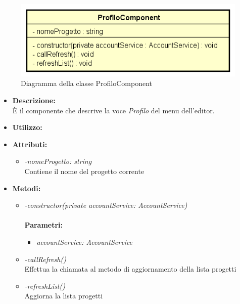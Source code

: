 \begin{figure}[h!]
	\centering
	\includegraphics[scale=0.8]{res/sections/SpecificaFrontEnd/Components/Disegnetti/profilo.png}
	\caption{Diagramma della classe ProfiloComponent}
\end{figure}

\begin{itemize}
	\item \textbf{Descrizione:}\\
	È il componente che descrive la voce \textit{Profilo} del menu dell'editor.
	\item \textbf{Utilizzo:}\\
	
	\item \textbf{Attributi:}
		\begin{itemize}
			\item \emph{-nomeProgetto: string}\\
			Contiene il nome del progetto corrente
		\end{itemize}
	\item \textbf{Metodi:}
		\begin{itemize}
			\item \emph{-constructor(private accountService: AccountService)}\\
    		\\
    		\textbf{Parametri:}
    		\begin{itemize}
    		    			
    			\item \emph{accountService: AccountService}\\
    			
    		\end{itemize}
    		\item \emph{-callRefresh()}\\
    		Effettua la chiamata al metodo di aggiornamento della lista progetti\\
    		\item \emph{-refreshList()}\\
    		Aggiorna la lista progetti
		\end{itemize}
\end{itemize}